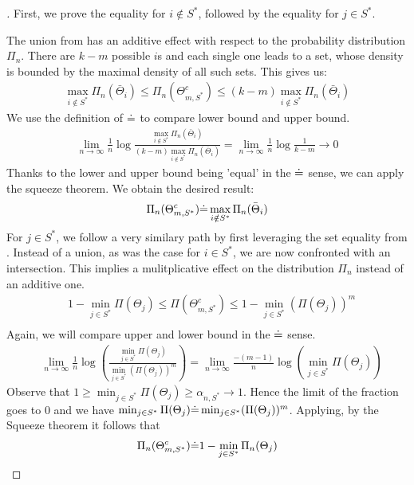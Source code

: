 \begin{proof}[]
  First, we prove the equality for $i \notin S^*$, followed by the equality for $j \in S^*$.

  The union from  has an additive effect with respect to the probability distribution $\Pi_n$. There are $k-m$ possible $i$s and each single one leads to a set, whose density is bounded by the maximal density of all such sets. This gives us:
  \begin{align}
    \max_{i \notin S^*} \Pi_n(\bar{\Theta}_i) \leq \Pi_n(\Theta_{m, S^*}^c) \leq (k-m) \max_{i \notin S^*} \Pi_n(\bar{\Theta}_i)
  \end{align}
  We use the definition of $\dot{=}$ to compare lower bound and upper bound.
  \begin{align}
    \lim_{n \rightarrow \infty} \frac{1}{n} \log{\frac{\max_{i \notin S^*} \Pi_n(\bar{\Theta}_i)}{(k-m)\max_{i \notin S^*} \Pi_n(\bar{\Theta}_i)}}
    = \lim_{n \rightarrow \infty} \frac{1}{n} \log{\frac{1}{k-m}} \rightarrow 0
  \end{align}
  Thanks to the lower and upper bound being 'equal' in the $\dot{=}$ sense, we can apply the squeeze theorem. We obtain the desired result:
  \begin{align}
    \Pi_n(\Theta_{m, S^*}^c) \dot{=} \max_{i \notin S^*} \Pi_n(\bar{\Theta}_i)
  \end{align}
  For $j \in S^*$, we follow a very similary path by first leveraging the set equality from . Instead of a union, as was the case for $i \in S^*$, we are now confronted with an intersection. This implies a mulitplicative effect on the distribution $\Pi_n$ instead of an additive one.
  \begin{align}
    &1 - \min_{j \in S^*} \Pi(\Theta_j) \leq \Pi(\Theta_{m, S^*}^c) \leq 1 - \min_{j \in S^*} (\Pi(\Theta_j))^m \\
  \end{align}
  Again, we will compare upper and lower bound in the $\dot{=}$ sense.
  \begin{align}
    &\lim_{n \rightarrow \infty} \frac{1}{n} \log(\frac{\min_{j \in S^*} \Pi(\Theta_j)}{\min_{j \in S^*} (\Pi(\Theta_j))^m}) = \lim_{n \rightarrow \infty} \frac{-(m - 1)}{n} \log(\min_{j \in S^*} \Pi(\Theta_j))
  \end{align}
  Observe that $1 \geq \min_{j \in S^*} \Pi(\Theta_j) \geq \alpha_{n, S^*} \rightarrow 1$. Hence the limit of the fraction goes to 0 and we have $\min_{j \in S^*} \Pi(\Theta_j) \dot{=} \min_{j \in S^*} (\Pi(\Theta_j))^m$. Applying, by the Squeeze theorem it follows that
  \begin{align}
    \Pi_n(\Theta_{m, S^*}^c) \dot{=} 1 - \min_{j \in S^*} \Pi_n(\Theta_j)
  \end{align}
\end{proof}

